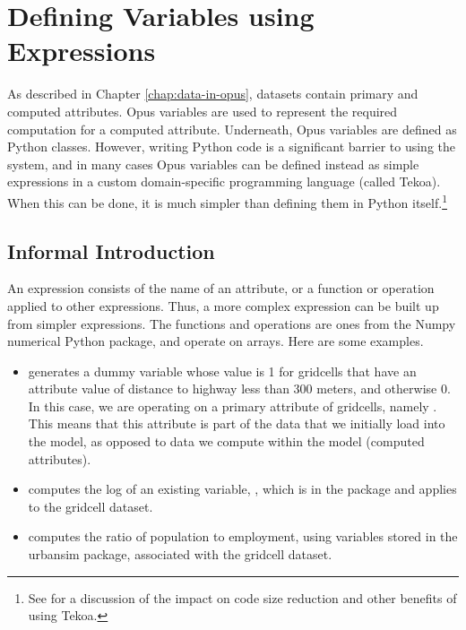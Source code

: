 \chapter{Defining Variables using Expressions}
\label{chapter:expressions}

As described in Chapter \ref{chap:data-in-opus}, datasets contain primary
and computed attributes.  Opus variables are used to represent the required
computation for a computed attribute.  Underneath, Opus variables are
defined as Python classes.  However, writing Python code is a significant
barrier to using the system, and in many cases Opus variables can be
defined instead as simple expressions in a custom domain-specific
programming language (called Tekoa).  When this can be done, it is much
simpler than defining them in Python itself.\footnote{See
  \cite{borning-dgo-tekoa-2008} for a discussion of the impact on code size
  reduction and other benefits of using Tekoa.}

\section{Informal Introduction}

An expression consists of the name of an attribute, or a function or
operation applied to other expressions.  Thus, a more complex expression
can be built up from simpler expressions.  The functions and operations are
ones from the Numpy  numerical Python package, and operate on
arrays.  Here are some examples.

\begin{itemize}

\item {} generates a dummy
  variable whose value is 1 for gridcells that have an attribute value of
  distance to highway less than 300 meters, and otherwise 0.  In this case,
  we are operating on a primary attribute of gridcells, namely
  .  This means that this
  attribute is part of the data that we initially load into the model, as
  opposed to data we compute within the model (computed attributes).  

\item {} computes the log of
  an existing variable, , which is in the
   package and applies to the gridcell dataset.

\item {} computes the ratio of population to
  employment, using variables stored in the urbansim package, associated
  with the gridcell dataset.

\end{itemize}

